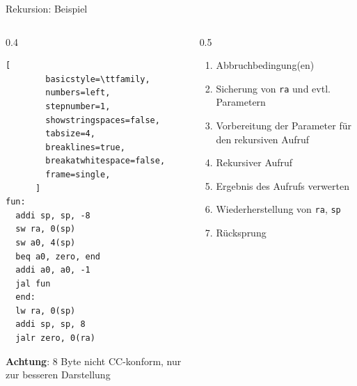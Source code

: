 \begin{frame}[c, fragile]{Rekursion: Beispiel}{}
	\begin{columns}[c]
		\begin{column}{0.4\linewidth}
			\begin{lstlisting}[
        basicstyle=\ttfamily,
        numbers=left,
        stepnumber=1,
        showstringspaces=false,
        tabsize=4,
        breaklines=true,
        breakatwhitespace=false,
        frame=single,
      ]
fun:
  addi sp, sp, -8
  sw ra, 0(sp)
  sw a0, 4(sp)
  beq a0, zero, end
  addi a0, a0, -1
  jal fun
  end:
  lw ra, 0(sp)
  addi sp, sp, 8
  jalr zero, 0(ra)
      \end{lstlisting}
			\small \textbf{Achtung}: 8 Byte nicht CC-konform, nur zur besseren Darstellung
		\end{column}
		\begin{column}{0.5\linewidth}
			\begin{enumerate}
				\item Abbruchbedingung(en)
				\item Sicherung von \verb|ra| und evtl. Parametern
				\item Vorbereitung der Parameter für den rekursiven Aufruf
				\item Rekursiver Aufruf
				\item Ergebnis des Aufrufs verwerten
				\item Wiederherstellung von \verb|ra|, \verb|sp|
				\item Rücksprung
			\end{enumerate}
			\vspace{1cm}
		\end{column}
	\end{columns}
\end{frame}


